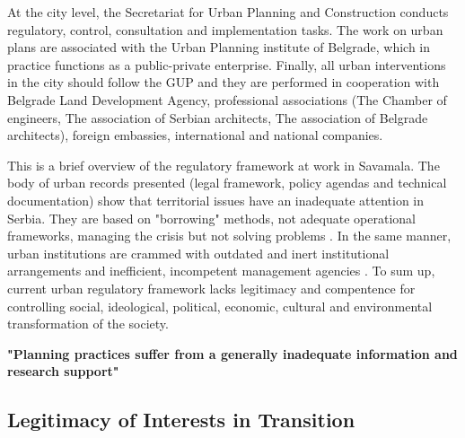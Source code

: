 \documentclass[11pt]{report}
\begin{document}
At the city level, the Secretariat for Urban Planning and Construction conducts regulatory, control, consultation and implementation tasks. The work on urban plans are associated with the Urban Planning institute of Belgrade, which in practice functions as a public-private enterprise. 
Finally, all urban interventions in the city should follow the GUP and they are performed in  cooperation  with  Belgrade Land Development Agency, professional  associations (The Chamber of engineers, The association of Serbian architects, The association of Belgrade architects), foreign  embassies, international and national companies.

This is a brief overview of the regulatory framework at work in Savamala. 
The body of urban records presented (legal framework, policy agendas and technical documentation) show that territorial issues have an inadequate attention in Serbia. They are based on "borrowing" methods, not adequate operational frameworks, managing the crisis but not solving problems
\cite{adjustment of planning practice nedovic budic 2001, Vujosevic and Maricic 2012}.
In the same manner, urban institutions are crammed with outdated and inert institutional arrangements and inefficient, incompetent management agencies
\cite{Vujosevic and Maricic 2012}.
To sum up, current urban regulatory framework lacks legitimacy and compentence for controlling social, ideological, political, economic, cultural and environmental transformation of the society.

\textbf{"Planning practices suffer from a generally inadequate information and research support" \cite{Vujosevic 2012}}

\subsection{Legitimacy of Interests in Transition}
\end{document}
